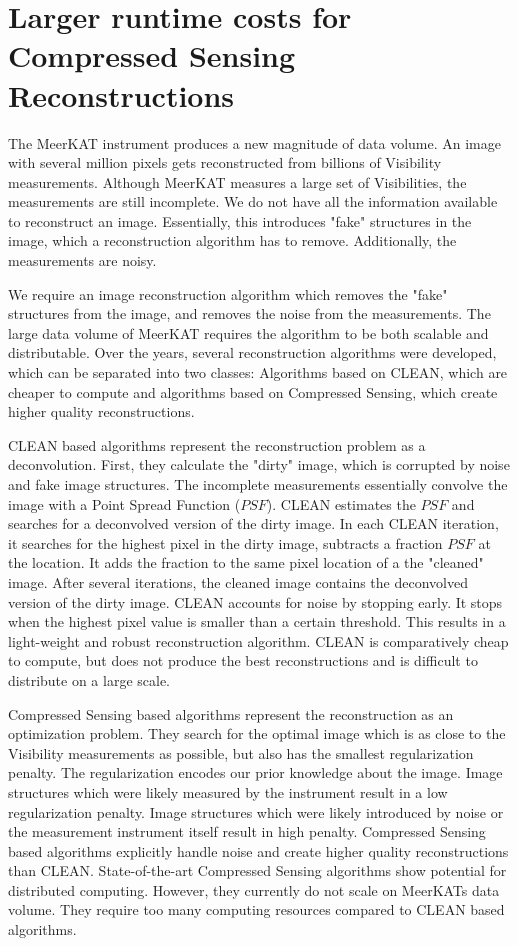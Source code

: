 \section{Larger runtime costs for Compressed Sensing Reconstructions}\label{hypo}
The MeerKAT instrument produces a new magnitude of data volume. An image with several million pixels gets reconstructed from billions of Visibility measurements. Although MeerKAT measures a large set of Visibilities, the measurements are still incomplete. We do not have all the information available to reconstruct an image. Essentially, this introduces "fake" structures in the image, which a reconstruction algorithm has to remove. Additionally, the measurements are noisy.

We require an image reconstruction algorithm which removes the "fake" structures from the image, and removes the noise from the measurements. The large data volume of MeerKAT requires the algorithm to be both scalable and distributable. Over the years, several reconstruction algorithms were developed, which can be separated into two classes: Algorithms based on CLEAN, which are cheaper to compute and algorithms based on Compressed Sensing, which create higher quality reconstructions.

CLEAN based algorithms represent the reconstruction problem as a deconvolution. First, they calculate the "dirty" image, which is corrupted by noise and fake image structures. The incomplete measurements essentially convolve the image with a Point Spread Function ($PSF$). CLEAN estimates the $PSF$ and searches for a deconvolved version of the dirty image. In each CLEAN iteration, it searches for the highest pixel in the dirty image, subtracts a fraction $PSF$ at the location. It adds the fraction to the same pixel location of a the "cleaned" image. After several iterations, the cleaned image contains the deconvolved version of the dirty image. CLEAN accounts for noise by stopping early. It stops when the highest pixel value is smaller than a certain threshold. This results in a light-weight and robust reconstruction algorithm. CLEAN is comparatively cheap to compute, but does not produce the best reconstructions and is difficult to distribute on a large scale.

Compressed Sensing based algorithms represent the reconstruction as an optimization problem. They search for the optimal image which is as close to the Visibility measurements as possible, but also has the smallest regularization penalty. The regularization encodes our prior knowledge about the image. Image structures which were likely measured by the instrument result in a low regularization penalty. Image structures which were likely introduced by noise or the measurement instrument itself result in high penalty. Compressed Sensing based algorithms explicitly handle noise and create higher quality reconstructions than CLEAN. State-of-the-art Compressed Sensing algorithms show potential for distributed computing. However, they currently do not scale on MeerKATs data volume. They require too many computing resources compared to CLEAN based algorithms.
 
